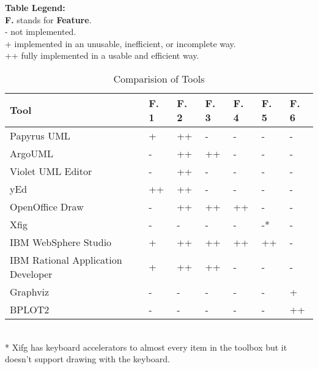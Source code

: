 \begin{center}
\begin{table}[h]
\footnotesize
{\bf Table Legend:}\\
{\bf F.} stands for {\bf Feature}.\\
- not implemented.\\
+ implemented in an unusable, inefficient, or incomplete way.\\
++ fully implemented in a usable and efficient way.\\
	\begin{tabular}{ | l | l | l | l | l | l | l |}
	\hline
	{\bf Tool} & {\bf F. 1} & {\bf F. 2} & {\bf F. 3} & {\bf F. 4} & {\bf F. 5} & {\bf F. 6}\\ \hline \hline 
	Papyrus UML\cite{papyrus} & + & ++ & - & - & - & -\\ \hline
	ArgoUML\cite{argouml} & - & ++ & ++ & - & - & -\\ \hline
	Violet UML Editor\cite{violet} & - & ++ & - & - & - & -\\ \hline
	yEd\cite{yed} & ++ & ++ & - & - & - & -\\ \hline
	OpenOffice Draw\cite{oo_draw} & - & ++ & ++ & ++ & - & -\\ \hline
	Xfig\cite{xfig} & - & - & - & - & -* & -\\ \hline
	IBM WebSphere Studio\cite{ibm_websphere_studio} & + & ++ & ++ & ++ & ++ & -\\ \hline
	IBM Rational Application Developer\cite{ibm_rational_application_developper} & + & ++ & ++ & - & - & -\\ \hline
	Graphviz\cite{graphviz} & - & - & - & - & - & +\\ \hline
	BPLOT2\cite{bplot2} & - & - & - & - & - & ++\\ \hline
	\end{tabular}\\
\footnotesize
{* Xifg has keyboard accelerators to almost every item in the toolbox but it doesn't support drawing with the keyboard.}
\caption{Comparision of Tools}
\end{table}
\end{center}

